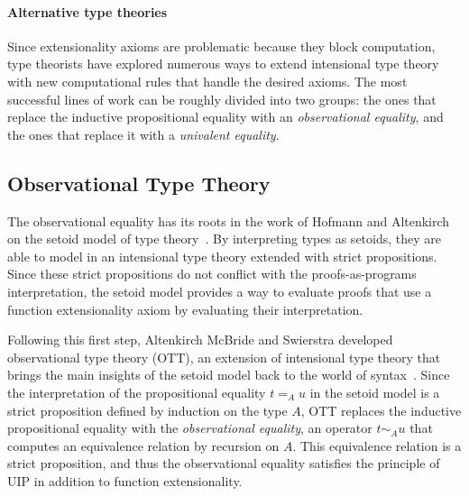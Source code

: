 \paragraph*{Alternative type theories}
% 
Since extensionality axioms are problematic because they block 
computation, type theorists have explored numerous ways to extend intensional
type theory with new computational rules that handle the desired axioms.
% 
The most successful lines of work can be roughly divided into two groups: the 
ones that replace the inductive propositional equality with an \emph{observational equality}, 
and the ones that replace it with a \emph{univalent equality}.
% 

\subsection{Observational Type Theory}

The observational equality has its roots in the work of Hofmann and 
Altenkirch on the setoid model of type theory~\cite{hofmann95,altenkirch99}.
% 
By interpreting types as setoids, they are able to model
in an intensional type theory extended with strict propositions.
Since these strict propositions do not conflict with the proofs-as-programs 
interpretation, the setoid model provides a way to evaluate proofs that use a 
function extensionality axiom by evaluating their interpretation.

Following this first step, Altenkirch McBride and Swierstra developed observational type
theory (OTT), an extension of intensional type theory that brings the main insights 
of the setoid model back to the world of syntax~.
% 
Since the interpretation of the propositional equality \( {t =_A u} \) in the setoid 
model is a strict proposition defined by induction on the type \( A \), OTT 
replaces the inductive propositional equality with the \emph{observational equality}, an operator 
\( t \sim_A u \) that computes an equivalence relation by 
recursion on \( A \). 
% 
This equivalence relation is a strict proposition, and thus the observational equality satisfies the
principle of UIP in addition to function extensionality.

